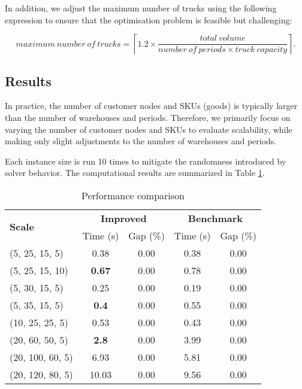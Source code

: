 \documentclass[a4paper,12pt]{article}
\begin{document}
In addition, we adjust the maximum number of trucks using the following expression to ensure that the optimisation problem is feasible but challenging:

$$
maximum \ number \ of \ trucks =\left\lceil 1.2 \times \frac{total \  volume}{number \ of \  periods \times truck \ capacity} \right\rceil .
$$

\subsection{Results}\label{subsec:results}

In practice, the number of customer nodes and SKUs (goods) is typically larger than the number of warehouses and periods.
Therefore, we primarily focus on varying the number of customer nodes and SKUs to evaluate scalability, while making only slight adjustments to the number of warehouses and periods.

Each instance size is run 10 times to mitigate the randomness introduced by solver behavior.
The computational results are summarized in Table \ref{tab:method-comparison}.

\begin{table}[htbp]
    \centering
    \caption{Performance comparison}
    \label{tab:method-comparison}
    \begin{tabular}{lcc|cc}
        \toprule
        \multirow{2}{*}{\textbf{Scale}} & \multicolumn{2}{c|}{\textbf{Improved}} & \multicolumn{2}{c}{\textbf{Benchmark}} \\
        & Time (s) & Gap (\%) & Time (s) & Gap (\%) \\
        \midrule
        (5, 25, 15, 5)   & 0.38 & 0.00 & 0.38  & 0.00  \\
        (5, 25, 15, 10)   & \textbf{0.67} & 0.00 & 0.78  & 0.00  \\
        (5, 30, 15, 5)   & 0.25  & 0.00 & 0.19  & 0.00  \\
        (5, 35, 15, 5)  & \textbf{0.4}  & 0.00 & 0.55  & 0.00 \\
        (10, 25, 25, 5) & 0.53 & 0.00 & 0.43 & 0.00 \\
        (20, 60, 50, 5) & \textbf{2.8} & 0.00 & 3.99 & 0.00 \\
        (20, 100, 60, 5) & 6.93 & 0.00 & 5.81 & 0.00 \\
        (20, 120, 80, 5) & 10.03 & 0.00 & 9.56 & 0.00 \\
        \bottomrule
    \end{tabular}
\end{table}
\end{document}
